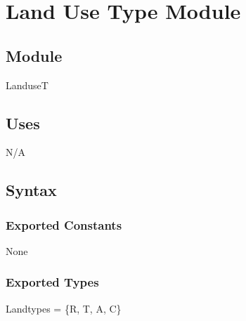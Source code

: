 \documentclass[12pt]{article}
\begin{document}
\subsubsection{}







































\newpage
\section* {Land Use Type Module}

\subsection*{Module}

LanduseT

\subsection* {Uses}

N/A

\subsection* {Syntax}

\subsubsection* {Exported Constants}

None

\subsubsection* {Exported Types}

Landtypes = \{R, T, A, C\}\\
\end{document}
